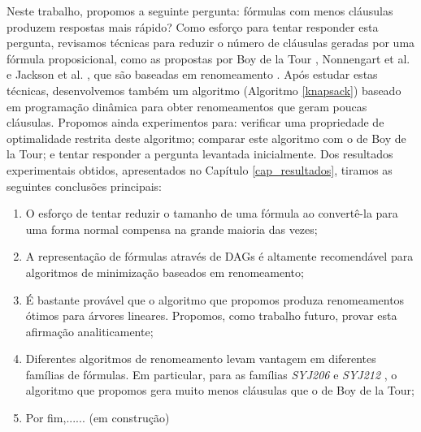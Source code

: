 
\label{cap_conclusoes}

\indent

Neste trabalho, propomos a seguinte pergunta: fórmulas com menos cláusulas produzem respostas mais rápido? Como esforço para tentar responder esta pergunta, revisamos técnicas para reduzir o número de cláusulas geradas por uma fórmula proposicional, como as propostas por Boy de la Tour \cite{de1992optimality}, Nonnengart et al. \cite{nonnengart2001computing} e Jackson et al. \cite{jackson2004clause}, que são baseadas em renomeamento \cite{plaisted1986structure}. Após estudar estas técnicas, desenvolvemos também um algoritmo (Algoritmo \ref{knapsack}) baseado em programação dinâmica \cite{bellman2015applied} para obter renomeamentos que geram poucas cláusulas. Propomos ainda experimentos para: verificar uma propriedade de optimalidade restrita deste algoritmo; comparar este algoritmo com o de Boy de la Tour; e tentar responder a pergunta levantada inicialmente. Dos resultados experimentais obtidos, apresentados no Capítulo \ref{cap_resultados}, tiramos as seguintes conclusões principais:
\begin{enumerate}
	\item O esforço de tentar reduzir o tamanho de uma fórmula ao convertê-la para uma forma normal compensa na grande maioria das vezes;
	\item A representação de fórmulas através de DAGs é altamente recomendável para algoritmos de minimização baseados em renomeamento;
	\item É bastante provável que o algoritmo que propomos produza renomeamentos ótimos para árvores lineares. Propomos, como trabalho futuro, provar esta afirmação analiticamente;
	\item Diferentes algoritmos de renomeamento levam vantagem em diferentes famílias de fórmulas. Em particular, para as famílias \emph{SYJ206} e \emph{SYJ212} \cite{raths07jar}, o algoritmo que propomos gera muito menos cláusulas que o de Boy de la Tour;
	\item Por fim,...... (em construção)
\end{enumerate}

